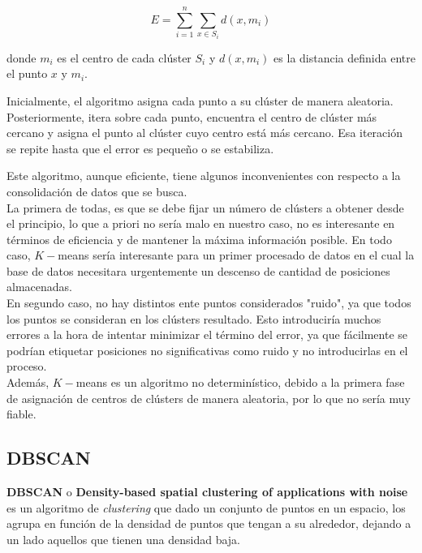 \documentclass[a4paper, 12pt]{article}
\begin{document}
$$ E=\sum_{i=1}^{n} \sum_{x\in S_i} d(x, m_i) $$

donde $m_i$ es el centro de cada cl\'uster $S_i$ y $d(x, m_i)$ es la distancia definida entre el punto $x$ y $m_i$.

Inicialmente, el algoritmo asigna cada punto a su cl\'uster de manera aleatoria. Posteriormente, itera sobre cada punto, encuentra el centro de cl\'uster m\'as cercano y asigna el punto al cl\'uster cuyo centro est\'a m\'as cercano. Esa iteraci\'on se repite hasta que el error es peque\~no o se estabiliza.

Este algoritmo, aunque eficiente, tiene algunos inconvenientes con respecto a la consolidaci\'on de datos que se busca.
\\

La primera de todas, es que se debe fijar un n\'umero de cl\'usters a obtener desde el principio, lo que a priori no ser\'ia malo en nuestro caso, no es interesante en t\'erminos de eficiencia y de mantener la m\'axima informaci\'on posible. En todo caso, $K-$means ser\'ia interesante para un primer procesado de datos en el cual la base de datos necesitara urgentemente un descenso de cantidad de posiciones almacenadas. \\

En segundo caso, no hay distintos ente puntos considerados "ruido", ya que todos los puntos se consideran en los cl\'usters resultado. Esto introducir\'ia muchos errores a la hora de intentar minimizar el t\'ermino del error, ya que f\'acilmente se podr\'ian etiquetar posiciones no significativas como ruido y no introducirlas en el proceso.\\

Adem\'as, $K-$means es un algoritmo no determin\'istico, debido a la primera fase de asignaci\'on de centros de cl\'usters de manera aleatoria, por lo que no ser\'ia muy fiable.\\


\subsection{DBSCAN}

\textbf{DBSCAN}\cite{importantPlaces} o \textbf{Density-based spatial clustering of applications with noise} es un algoritmo de \textit{clustering} que dado un conjunto de puntos en un espacio, los agrupa en funci\'on de la densidad de puntos que tengan a su alrededor, dejando a un lado aquellos que tienen una densidad baja. \\
\end{document}
